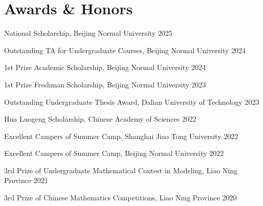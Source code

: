 \documentclass[a4paper,11pt]{article}
\begin{document}
\section{\bfseries{Awards \& Honors}}

\begin{description}[font=$\bullet$]
    \item {National Scholarship, Beijing Normal University} 
    \hfill{2025}
    \vspace{-5pt}
    \item {Outstanding TA for Undergraduate Courses, Beijing Normal University}
    \hfill{2024}
    \vspace{-5pt}
    \item {1st Prize Academic Scholarship, Beijing Normal University} 
    \hfill{2024}
    \vspace{-5pt}
    \item {1st Prize Freshman Scholarship, Beijing Normal University} 
    \hfill{2023}
    \vspace{-5pt}
    \item {Outstanding Undergraduate Thesis Award, Dalian University of Technology}
    \hfill{2023}
    \vspace{-5pt}
    \item {Hua Luogeng Scholarship, Chinese Academy of Sciences} 
    \hfill{2022}
    \vspace{-5pt}
    \item {Excellent Campers of Summer Camp, Shanghai Jiao Tong University}
    \hfill{2022}
    \vspace{-5pt}
    \item {Excellent Campers of Summer Camp, Beijing Normal University}
    \hfill{2022}
          \vspace{-5pt}
    \item {3rd Prize of Undergraduate Mathematical Contest in Modeling, Liao Ning Province}
    \hfill{2021}
    \vspace{-5pt}
    \item {3rd Prize of Chinese Mathematics Competitions,  Liao Ning Province}
    \hfill{2020}
    \vspace{-5pt}
\end{description}
\vspace{2pt}
\end{document}
